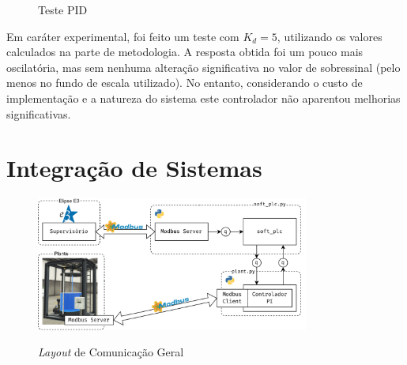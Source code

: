 \documentclass[
	article,			%
	11pt,				%
	oneside,			%
	a4paper,			%
	section=TITLE,		%
	english,			%
	brazil,				%
	sumario=tradicional
	]{abntex2}
\newcommand{\xPID}{130}%
\newcommand{\yPID}{1.2}%
\begin{document}
\begin{figure}[H]
    \centering
    \caption{Teste PID}
    \label{fig:comp-modelos-PID}
\end{figure}

    Em caráter experimental, foi feito um teste com $K_d = 5$, utilizando os valores calculados na parte de metodologia. A resposta obtida foi um pouco mais oscilatória, mas sem nenhuma alteração significativa no valor de sobressinal (pelo menos no fundo de escala utilizado). No entanto, considerando o custo de implementação e a natureza do sistema este controlador não aparentou melhorias significativas.
\newpage

\section{Integração de Sistemas}

\begin{figure}[H]
    \centering
\caption{\textit{Layout} de Comunicação Geral}
\includegraphics[width=0.8\textwidth]{img/diagrama-geral.png}
    \label{fig:arq_geral}
\end{figure}
\end{document}
